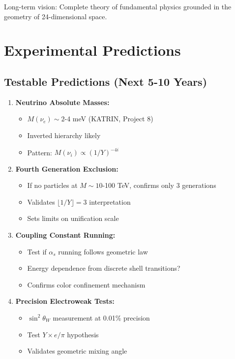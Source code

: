\documentclass[11pt,twocolumn]{article}
\begin{document}
Long-term vision: Complete theory of fundamental physics grounded in the geometry of 24-dimensional space.

\section{Experimental Predictions}

\subsection{Testable Predictions (Next 5-10 Years)}

\begin{enumerate}
\item \textbf{Neutrino Absolute Masses:}
   \begin{itemize}
   \item $M(\nu_e) \sim 2$-4 meV (KATRIN, Project 8)
   \item Inverted hierarchy likely
   \item Pattern: $M(\nu_i) \propto (1/Y)^{-4i}$
   \end{itemize}

\item \textbf{Fourth Generation Exclusion:}
   \begin{itemize}
   \item If no particles at $M \sim 10$-100 TeV, confirms only 3 generations
   \item Validates $\lfloor 1/Y \rfloor = 3$ interpretation
   \item Sets limits on unification scale
   \end{itemize}

\item \textbf{Coupling Constant Running:}
   \begin{itemize}
   \item Test if $\alpha_s$ running follows geometric law
   \item Energy dependence from discrete shell transitions?
   \item Confirms color confinement mechanism
   \end{itemize}

\item \textbf{Precision Electroweak Tests:}
   \begin{itemize}
   \item $\sin^2\theta_W$ measurement at 0.01\% precision
   \item Test $Y \times e/\pi$ hypothesis
   \item Validates geometric mixing angle
   \end{itemize}
\end{enumerate}
\end{document}
